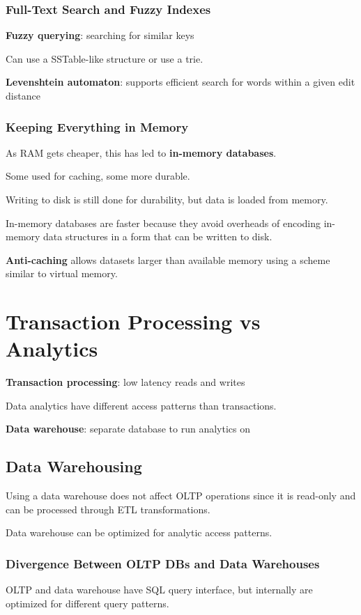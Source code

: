 \documentclass[11pt]{article}
\begin{document}
\subsubsection{Full-Text Search and Fuzzy Indexes}
\label{sec:orge5fc2de}
\textbf{Fuzzy querying}: searching for similar keys

Can use a SSTable-like structure or use a trie.

\textbf{Levenshtein automaton}: supports efficient search for words
within a given edit distance
\subsubsection{Keeping Everything in Memory}
\label{sec:org3e387f1}
As RAM gets cheaper, this has led to \textbf{in-memory databases}.

Some used for caching, some more durable.

Writing to disk is still done for durability, but data is loaded
from memory.

In-memory databases are faster because they avoid overheads
of encoding in-memory data structures in a form that can be
written to disk.

\textbf{Anti-caching} allows datasets larger than available memory using a
scheme similar to virtual memory.
\section{Transaction Processing vs Analytics}
\label{sec:orga71622a}
\textbf{Transaction processing}: low latency reads and writes

Data analytics have different access patterns than transactions.

\textbf{Data warehouse}: separate database to run analytics on
\subsection{Data Warehousing}
\label{sec:orgd035722}
Using a data warehouse does not affect OLTP operations
since it is read-only and can be processed through ETL
transformations.

Data warehouse can be optimized for analytic access patterns.
\subsubsection{Divergence Between OLTP DBs and Data Warehouses}
\label{sec:orgef5e370}
OLTP and data warehouse have SQL query interface, but internally
are optimized for different query patterns.
\end{document}
